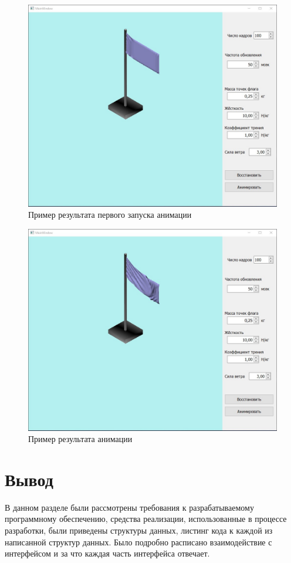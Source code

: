 \begin{figure}[ht!]
	\centering
	\includegraphics[scale=0.65]{example1.jpg}
	\caption{Пример результата первого запуска анимации}
	\label{fig:example}
\end{figure}

\begin{figure}[ht!]
	\centering
	\includegraphics[scale=0.65]{example2.jpg}
	\caption{Пример результата анимации}
	\label{fig:example}
\end{figure}

\newpage

\section{Вывод}
\hspace{0.6cm}В данном разделе были рассмотрены требования к разрабатываемому программному обеспечению, средства реализации, использованные в процессе разработки, были приведены структуры данных, листинг кода к каждой из написанной структур данных. Было подробно расписано взаимодействие с интерфейсом и за что каждая часть интерфейса отвечает.
